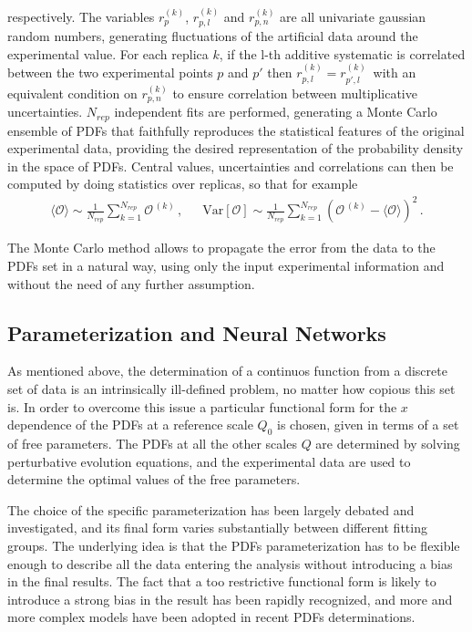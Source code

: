 respectively. The variables $r_{p}^{(k)}$, $r_{p,l}^{(k)}$ and $r_{p,n}^{(k)}$
are all univariate gaussian random numbers, generating fluctuations of the artificial data around the experimental value.
For each replica $k$, if the l-th additive systematic is correlated between the two experimental points $p$ and $p'$
then $r_{p,l}^{(k)} = r_{p',l}^{(k)}\,$ with an equivalent condition on $r_{p,n}^{(k)}$ to ensure correlation between multiplicative
uncertainties. 
$N_{rep}$ independent fits are performed, generating a Monte Carlo ensemble of
PDFs that faithfully reproduces the statistical features of the original experimental 
data, providing the desired representation of the probability density in the space of PDFs.
Central values, uncertainties and correlations can then be computed by doing statistics over
replicas, so that for example
\begin{align}
    \label{eq:expectation_value_observable_mc}
    \langle \mathcal{O}\rangle \sim \frac{1}{N_{rep}}\sum_{k=1}^{N_{rep}}
    \mathcal{O}^{\,(k)}\,,\,\,\,\,\,\,\,\,\,
    \text{Var}\left[\mathcal{O}\right] \sim 
    \frac{1}{N_{rep}}\sum_{k=1}^{N_{rep}}\left(\mathcal{O}^{\,(k)} - \langle\mathcal{O}\rangle\right)^2\,.
\end{align}

The Monte Carlo method allows to propagate the error from the data to the PDFs set
in a natural way, using only the input experimental information and without the need of any further assumption.

\subsection{Parameterization and Neural Networks}
As mentioned above, the determination of a continuos function from a discrete set of data 
is an intrinsically ill-defined problem, no matter how copious this set is. In order to overcome this
issue a particular functional form for the $x$ dependence of the PDFs at a reference scale $Q_0$ is chosen,
given in terms of a set of free parameters.
The PDFs at all the other scales $Q$ are determined by solving perturbative evolution equations, 
and the experimental data are used to determine the optimal values of the free parameters.

%
The choice of the specific parameterization has been largely debated and investigated,
and its final form varies substantially between different fitting groups.
The underlying idea is that the PDFs parameterization has to be flexible enough to describe all the data
entering the analysis without introducing a bias in the final results.
The fact that a too restrictive functional form is likely to introduce a strong bias in the result
has been rapidly recognized, and more and more complex models have been adopted in recent PDFs determinations.


